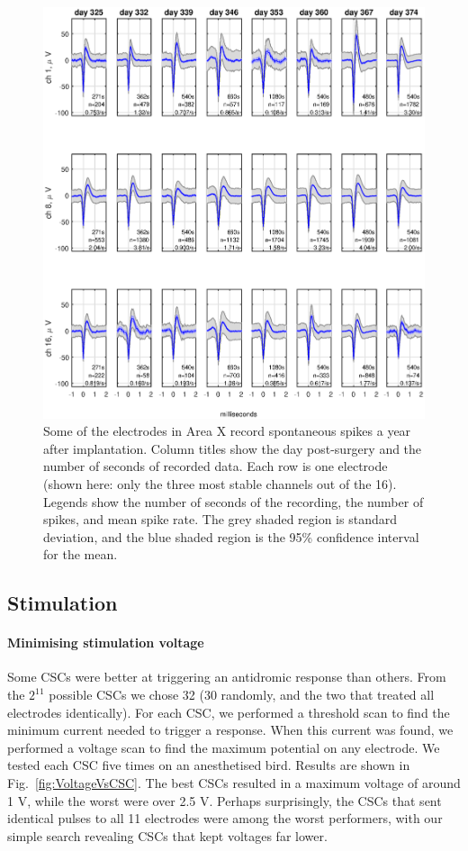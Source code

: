 \documentclass[10pt,letterpaper]{article}
\newcommand\fig[1]{Fig.~\ref{#1}}
\renewcommand{\subsubsection}[1]{\paragraph{#1}}
\begin{document}
\begin{figure}
  \includegraphics[width=\textwidth]{XSpikeRecording}
  \caption{Some of the electrodes in Area X record spontaneous spikes
    a year after implantation.  Column titles show the day
    post-surgery and the number of seconds of recorded data.  Each row
    is one electrode (shown here: only the three most stable channels
    out of the 16).  Legends show the number of seconds of the
    recording, the number of spikes, and mean spike rate.  The grey
    shaded region is standard deviation, and the blue shaded region is
    the 95\% confidence interval for the mean.}
  \label{fig:XSpikeRecording}
\end{figure}


\subsection{Stimulation}

\subsubsection{Minimising stimulation voltage}

Some CSCs were better at triggering an antidromic response than
others.  From the $2^{11}$ possible CSCs we chose 32 (30 randomly, and
the two that treated all electrodes identically).  For each CSC, we
performed a threshold scan to find the minimum current needed to
trigger a response.  When this current was found, we performed a
voltage scan to find the maximum potential on any electrode.  We
tested each CSC five times on an anesthetised bird.  Results are shown
in \fig{fig:VoltageVsCSC}.  The best CSCs resulted in a maximum
voltage of around 1 V, while the worst were over 2.5 V.  Perhaps
surprisingly, the CSCs that sent identical pulses to all 11 electrodes
were among the worst performers, with our simple search revealing CSCs
that kept voltages far lower.
\end{document}
